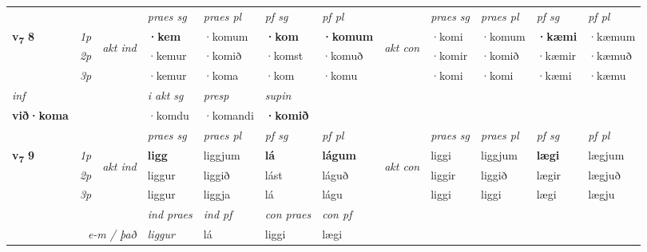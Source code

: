 \begin{longtable}[l]{X>{\footnotesize\itshape}llXXXXlXXXX}
 & &   & \textit{praes sg}  & \textit{praes pl}    & \textit{ pf sg} & \textit{pf pl} & & \textit{praes sg}  & \textit{praes pl}    & \textit{pf sg} & \textit{pf pl }  \\ \cmidrule{4-7} \cmidrule{9-12}
 \multirow{2}{*}{{{\textbf{v{\textsubscript{7}}} \Large{\textbf{8}}}}}  & 1p & \multirow{3}{*}{\begin{turn}{90}\textit{akt ind}\end{turn}} & \textbf{·kem} & ·komum & \textbf{·kom} & \textbf{·komum} & \multirow{3}{*}{\begin{turn}{90}\textit{akt con}\end{turn}} &·komi & ·komum & \textbf{·kæmi} & ·kæmum\\*
 & 2p &  &  ·kemur  & ·komið & ·komst & ·komuð & & ·komir & ·komið & ·kæmir & ·kæmuð \\*
 & 3p &  & ·kemur & ·koma & ·kom & ·komu & & ·komi & ·komi& ·kæmi & ·kæmu \\*
\cmidrule{4-7} \cmidrule{9-12}

   {\textit{inf}} & &  & \textit{i akt sg}    & \textit{presp} & \textit{supin}   \\*
  {\textbf{við\allowbreak ·koma}} & && ·komdu     & ·komandi &  \textbf{·komið}   \\*

\midrule

 & &   & \textit{praes sg}  & \textit{praes pl}    & \textit{ pf sg} & \textit{pf pl} & & \textit{praes sg}  & \textit{praes pl}    & \textit{pf sg} & \textit{pf pl }  \\ \cmidrule{4-7} \cmidrule{9-12}
 \multirow{2}{*}{{{\textbf{v{\textsubscript{7}}} \Large{\textbf{9}}}}}  & 1p & \multirow{3}{*}{\begin{turn}{90}\textit{akt ind}\end{turn}} & \textbf{ligg} & liggjum & \textbf{lá} & \textbf{lágum} & \multirow{3}{*}{\begin{turn}{90}\textit{akt con}\end{turn}} &liggi & liggjum & \textbf{lægi} & lægjum\\*
 & 2p &  &  liggur  & liggið & lást & láguð & & liggir & liggið & lægir & lægjuð \\*
 & 3p &  & liggur & liggja & lá & lágu & & liggi & liggi& lægi & lægju \\*
\cmidrule{4-7} \cmidrule{9-12}

   && &  \textit{ind praes} & \textit{ind pf} & \textit{con praes} & \textit{con pf} \\*
\multicolumn{3}{r}{\textit{e-m / það}} & liggur & lá & liggi & lægi \\*


\end{longtable}
